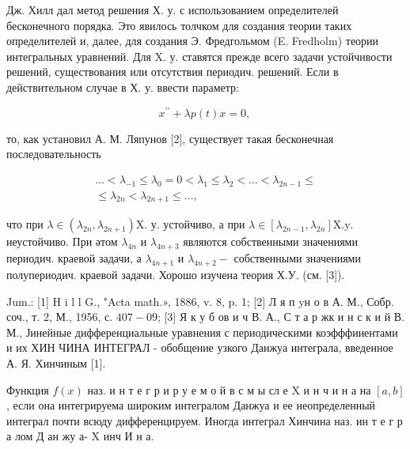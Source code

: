 \documentclass[10pt]{article}
\begin{document}
Дж. Хилл дал метод решения Х. у. с использованием определителей бесконечного порядка. Это явилось толчком для создания теории таких определителей и, далее, для создания Э. Фредгольмом (E. Fredholm) теории интегральных уравнений. Для $\mathrm{X}$. у. ставятся прежде всего задачи устойчивости решений, существования или отсутствия периодич. решений. Если в действительном случае в Х. у. ввести параметр:



\[

x^{\prime \prime}+\lambda p(t) x=0 \text {, }

\]



то, как установил А. М. Ляпунов [2], существует такая бесконечная последовательность



\[

\begin{gathered}

\ldots<\lambda_{-1} \leqslant \lambda_{0}=0<\lambda_{1} \leqslant \lambda_{2}<\ldots<\lambda_{2 n-1} \leqslant \\

\leqslant \lambda_{2 n}<\lambda_{2 n+1} \leqslant \ldots,

\end{gathered}

\]



что при $\lambda \in\left(\lambda_{2 n}, \lambda_{2 n+1}\right) \mathrm{X}$. у. устойчиво, а при $\lambda \in\left[\lambda_{2 n-1}, \lambda_{2 n}\right] \mathrm{X} . \mathrm{y}$. неустойчиво. При әтом $\lambda_{4 n}$ и $\lambda_{4 n+3}$ являются собственными значениями периодич. краевой задачи, а $\lambda_{4 n+1}$ и $\lambda_{4 n+2}-$ собственными значениями полупериодич. краевой задачи. Хорошо изучена теория Х.У. (см. [3]).



Jum.: [1] H i l l G., "Acta math.», 1886, v. 8, p. 1; [2] Л я п yн о в А. М., Собр. соч., т. 2, М., 1956, с. $407-09$; [3] Я к у б ов и ч В. А., С т а р жк и н с к и й В. М., Јинейные дифференциальные уравнения с периодическими коэфффииентами и их ХИН ЧИНА ИНТЕГРАЛ - обобщение узкого Данжуа интеграла, введенное А. Я. Хинчиным [1].



Функция $f(x)$ наз. и н т е г р и р у е м о й в с м ы сл е X и н ч и н а на $[a, b]$, если она интегрируема широким интегралом Данжуа и ее неопределенный интеграл почти всюду дифференцируем. Иногда интеграл Хинчина наз. ин т е г р а лом Д ан жу а- X инч И н а.
\end{document}
